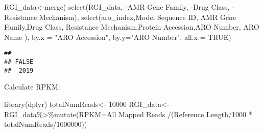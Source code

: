 \documentclass[
]{article}
\newenvironment{Shaded}{\begin{snugshade}}{\end{snugshade}}
\newcommand{\AttributeTok}[1]{\textcolor[rgb]{0.77,0.63,0.00}{#1}}
\newcommand{\ConstantTok}[1]{\textcolor[rgb]{0.00,0.00,0.00}{#1}}
\newcommand{\DecValTok}[1]{\textcolor[rgb]{0.00,0.00,0.81}{#1}}
\newcommand{\FunctionTok}[1]{\textcolor[rgb]{0.00,0.00,0.00}{#1}}
\newcommand{\NormalTok}[1]{#1}
\newcommand{\OtherTok}[1]{\textcolor[rgb]{0.56,0.35,0.01}{#1}}
\newcommand{\SpecialCharTok}[1]{\textcolor[rgb]{0.00,0.00,0.00}{#1}}
\newcommand{\StringTok}[1]{\textcolor[rgb]{0.31,0.60,0.02}{#1}}
\begin{document}
\begin{Shaded}
\begin{Highlighting}[]
\NormalTok{RGI\_data}\OtherTok{\textless{}{-}}\FunctionTok{merge}\NormalTok{(}
\FunctionTok{select}\NormalTok{(RGI\_data, }\SpecialCharTok{{-}}\StringTok{\textasciigrave{}}\AttributeTok{AMR Gene Family}\StringTok{\textasciigrave{}}\NormalTok{, }\SpecialCharTok{{-}}\StringTok{\textasciigrave{}}\AttributeTok{Drug Class}\StringTok{\textasciigrave{}}\NormalTok{, }\SpecialCharTok{{-}}\StringTok{\textasciigrave{}}\AttributeTok{Resistance Mechanism}\StringTok{\textasciigrave{}}\NormalTok{),}
\FunctionTok{select}\NormalTok{(aro\_index,}\StringTok{\textasciigrave{}}\AttributeTok{Model Sequence ID}\StringTok{\textasciigrave{}}\NormalTok{, }\StringTok{\textasciigrave{}}\AttributeTok{AMR Gene Family}\StringTok{\textasciigrave{}}\NormalTok{,}\StringTok{\textasciigrave{}}\AttributeTok{Drug Class}\StringTok{\textasciigrave{}}\NormalTok{, }\StringTok{\textasciigrave{}}\AttributeTok{Resistance Mechanism}\StringTok{\textasciigrave{}}\NormalTok{,}\StringTok{\textasciigrave{}}\AttributeTok{Protein Accession}\StringTok{\textasciigrave{}}\NormalTok{,}\StringTok{\textasciigrave{}}\AttributeTok{ARO Number}\StringTok{\textasciigrave{}}\NormalTok{, }\StringTok{\textasciigrave{}}\AttributeTok{ARO Name}\StringTok{\textasciigrave{}}\NormalTok{ ), }\AttributeTok{by.x =} \StringTok{"ARO Accession"}\NormalTok{, }\AttributeTok{by.y=}\StringTok{"ARO Number"}\NormalTok{, }\AttributeTok{all.x =} \ConstantTok{TRUE}\NormalTok{)}
\end{Highlighting}
\end{Shaded}

\begin{Shaded}
\end{Shaded}

\begin{verbatim}
## 
## FALSE 
##  2019
\end{verbatim}

Calculate RPKM:

\begin{Shaded}
\begin{Highlighting}[]
\FunctionTok{library}\NormalTok{(dplyr)}
\NormalTok{totalNumReads}\OtherTok{\textless{}{-}} \DecValTok{10000}
\NormalTok{RGI\_data}\OtherTok{\textless{}{-}}\NormalTok{RGI\_data}\SpecialCharTok{\%\textgreater{}\%}\FunctionTok{mutate}\NormalTok{(}\AttributeTok{RPKM=}\StringTok{\textasciigrave{}}\AttributeTok{All Mapped Reads}\StringTok{\textasciigrave{}} \SpecialCharTok{/}\NormalTok{(}\StringTok{\textasciigrave{}}\AttributeTok{Reference Length}\StringTok{\textasciigrave{}}\SpecialCharTok{/}\DecValTok{1000} \SpecialCharTok{*}\NormalTok{ totalNumReads}\SpecialCharTok{/}\DecValTok{1000000}\NormalTok{))}
\end{Highlighting}
\end{Shaded}
\end{document}
